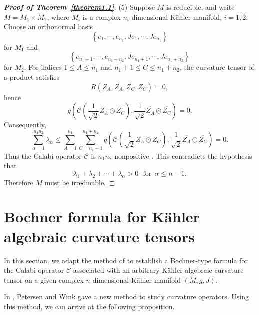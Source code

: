 \documentclass{amsart}
\theoremstyle{definition}
\theoremstyle{remark}
\numberwithin{equation}{section}
\begin{document}
\begin{proof}[{\bf Proof of Theorem~\ref{theorem1.1}}]
(5) Suppose $M$ is reducible, and write $M = M_1 \times M_2$, where $M_i$ is a complex $n_i$-dimensional K{\"a}hler manifold, $i=1,2$. Choose an orthonormal basis $$\left\{ {{e_1}, \cdots ,{e_{{n_1}}}} , {{Je_1}, \cdots ,{Je_{{n_1}}}} \right\}$$ for $M_1$ and $$\left\{ {{e_{{n_1} + 1}}, \cdots ,{e_{{n_1} + {n_2}}}},{{Je_{{n_1} + 1}}, \cdots ,{Je_{{n_1} + {n_2}}}} \right\}$$ for $ M_2$. For indices $1 \le A \le {n_1}$ and ${n_1} + 1 \le C \le {n_1} + {n_2}$, the curvature tensor of a product satisfies
$$ R\left( {{Z_A},\overline {{Z_A}} ,\overline {{Z_C}} ,{Z_C}} \right) = 0, $$
hence
$$g\left( {\mathcal{C}\left( {\frac{1}{{\sqrt 2 }}{Z_A} \odot {Z_C}} \right),\frac{1}{{\sqrt 2 }}\overline {{Z_A}}  \odot \overline {{Z_C}} } \right) =0.$$
Consequently,
$$\sum\limits_{\alpha  = 1}^{{n_1}  {n_2}} {{\lambda _\alpha }}  \le \sum\limits_{A = 1}^{{n_1}} {\sum\limits_{C = {n_1} + 1}^{{n_1} + {n_2}} {g\left( {\mathcal{C}\left( {\frac{1}{{\sqrt 2 }}{Z_A} \odot {Z_C}} \right),\frac{1}{{\sqrt 2 }}\overline {{Z_A}}  \odot \overline {{Z_C}} } \right)} }  = 0.$$
Thus the Calabi operator  $\mathcal{C}$ is $ {n_1}{n_2} $-nonpositive . This contradicts the hypothesis that $${\lambda _1} + {\lambda _2} +  \cdots  + {\lambda _\alpha} > 0\ \ \  \text{for}\ \   \alpha \le n-1.$$ Therefore $M$ must be irreducible.
\end{proof}


\section{Bochner formula for K{\"a}hler algebraic curvature tensors}
In this section, we adapt the method of \cite{dai2024einstein} to establish a Bochner-type formula for the Calabi operator $\mathcal{C}$ associated with an arbitrary K{\"a}hler algebraic curvature tensor on a given complex $n$-dimensional K{\"a}hler manifold $\left( {M,g,J} \right)$.

In \cite{2021New}, Petersen and Wink gave a new method to study curvature operators. Using this method, we can arrive at the following proposition.
\end{document}
